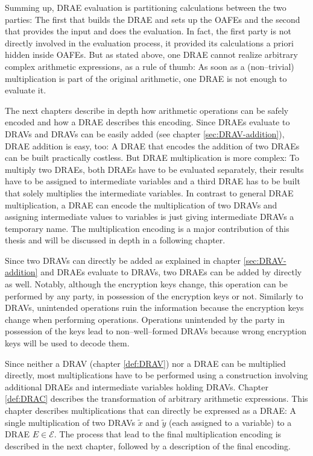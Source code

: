 Summing up, DRAE evaluation is partitioning calculations between the two
parties: The first that builds the DRAE and sets up the OAFEs and the second
that provides the input and does the evaluation. In fact, the first party is not
directly involved in the evaluation process, it provided its calculations a
priori hidden inside OAFEs. But as stated above, one DRAE cannot realize
arbitrary complex arithmetic expressions, as a rule of thumb: As soon as a
(non--trivial) multiplication is part of the original arithmetic, one DRAE is
not enough to evaluate it.

The next chapters describe in depth how arithmetic operations can be safely
encoded and how a DRAE describes this encoding. Since DRAEs evaluate to DRAVs
and DRAVs can be easily added (see chapter \ref{sec:DRAV-addition}), DRAE
addition is easy, too: A DRAE that encodes the addition of two DRAEs can be
built practically costless. But DRAE multiplication is more complex: To multiply
two DRAEs, both DRAEs have to be evaluated separately, their results have to be
assigned to intermediate variables and a third DRAE has to be built that solely
multiplies the intermediate variables. In contrast to general DRAE
multiplication, a DRAE can encode the multiplication of two DRAVs and assigning
intermediate values to variables is just giving intermediate DRAVs a temporary
name. The multiplication encoding is a major contribution of this thesis and
will be discussed in depth in a following chapter.


\label{sec:enc-adds}

Since two DRAVs can directly be added as explained in chapter
\ref{sec:DRAV-addition} and DRAEs evaluate to DRAVs, two DRAEs can be added by
directly as well. Notably, although the encryption keys change, this operation
can be performed by any party, in possession of the encryption keys or not.
Similarly to DRAVs, unintended operations ruin the information because the
encryption keys change when performing operations. Operations unintended by the
party in possession of the keys lead to non--well--formed DRAVs because wrong
encryption keys will be used to decode them.


\label{sec:enc-muls}

Since neither a DRAV (chapter \ref{def:DRAV}) nor a DRAE can be multiplied
directly, most multiplications have to be performed using a construction
involving additional DRAEs and intermediate variables holding DRAVs. Chapter
\ref{def:DRAC} describes the transformation of arbitrary arithmetic expressions.
This chapter describes multiplications that can directly be expressed as a DRAE:
A single multiplication of two DRAVs $\widetilde{x}$ and $\widetilde{y}$ (each
assigned to a variable) to a DRAE $E \in \mathcal{E}$. The process that lead to
the final multiplication encoding is described in the next chapter, followed by
a description of the final encoding.


